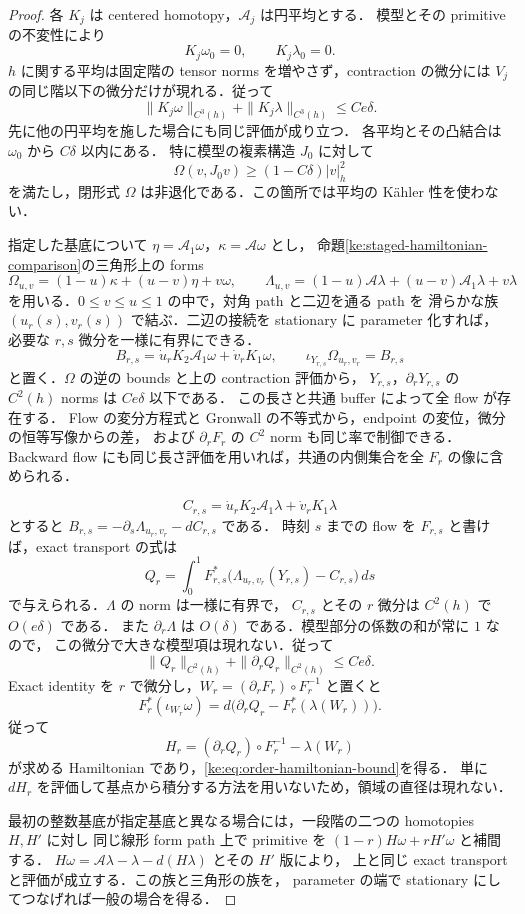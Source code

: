 \begin{proof}
各 $K_j$ は centered homotopy，$\mathcal A_j$ は円平均とする．
模型とその primitive の不変性により
\[
 K_j\omega_0=0,\qquad K_j\lambda_0=0.
\]
$h$ に関する平均は固定階の tensor norms を増やさず，contraction の微分には
$V_j$ の同じ階以下の微分だけが現れる．従って
\[
 \|K_j\omega\|_{C^3(h)}+
 \|K_j\lambda\|_{C^3(h)}\le Ce\delta.
\]
先に他の円平均を施した場合にも同じ評価が成り立つ．
各平均とその凸結合は $\omega_0$ から $C\delta$ 以内にある．
特に模型の複素構造 $J_0$ に対して
\[
 \Omega(v,J_0v)\ge(1-C\delta)|v|_h^2
\]
を満たし，閉形式 $\Omega$ は非退化である．この箇所では平均の K\"ahler 性を使わない．

指定した基底について $\eta=\mathcal A_1\omega$，$\kappa=\mathcal A\omega$ とし，
命題\ref{ke:staged-hamiltonian-comparison}の三角形上の forms
\[
 \Omega_{u,v}=(1-u)\kappa+(u-v)\eta+v\omega,\qquad
 \Lambda_{u,v}=(1-u)\mathcal A\lambda+(u-v)\mathcal A_1\lambda+v\lambda
\]
を用いる．$0\le v\le u\le1$ の中で，対角 path と二辺を通る path を
滑らかな族 $(u_r(s),v_r(s))$ で結ぶ．二辺の接続を stationary に parameter 化すれば，
必要な $r,s$ 微分を一様に有界にできる．
\[
 B_{r,s}=\dot u_r K_2\mathcal A_1\omega+\dot v_r K_1\omega,
 \qquad \iota_{Y_{r,s}}\Omega_{u_r,v_r}=B_{r,s}
\]
と置く．$\Omega$ の逆の bounds と上の contraction 評価から，
$Y_{r,s}$，$\partial_rY_{r,s}$ の $C^2(h)$ norms は $Ce\delta$ 以下である．
この長さと共通 buffer によって全 flow が存在する．
Flow の変分方程式と Gronwall の不等式から，endpoint の変位，微分の恒等写像からの差，
および $\partial_rF_r$ の $C^2$ norm も同じ率で制御できる．
Backward flow にも同じ長さ評価を用いれば，共通の内側集合を全 $F_r$ の像に含められる．

\[
 C_{r,s}=\dot u_rK_2\mathcal A_1\lambda+\dot v_rK_1\lambda
\]
とすると $B_{r,s}=-\partial_s\Lambda_{u_r,v_r}-dC_{r,s}$ である．
時刻 $s$ までの flow を $F_{r,s}$ と書けば，exact transport の式は
\[
 Q_r=\int_0^1F_{r,s}^*
       \bigl(\Lambda_{u_r,v_r}(Y_{r,s})-C_{r,s}\bigr)\,ds
\]
で与えられる．$\Lambda$ の norm は一様に有界で，
$C_{r,s}$ とその $r$ 微分は $C^2(h)$ で $O(e\delta)$ である．
また $\partial_r\Lambda$ は $O(\delta)$ である．模型部分の係数の和が常に $1$ なので，
この微分で大きな模型項は現れない．従って
\[
 \|Q_r\|_{C^2(h)}+\|\partial_rQ_r\|_{C^2(h)}\le Ce\delta.
\]
Exact identity を $r$ で微分し，$W_r=(\partial_rF_r)\circ F_r^{-1}$ と置くと
\[
 F_r^*(\iota_{W_r}\omega)
 =d\bigl(\partial_rQ_r-F_r^*(\lambda(W_r))\bigr).
\]
従って
\[
 H_r=(\partial_rQ_r)\circ F_r^{-1}-\lambda(W_r)
\]
が求める Hamiltonian であり，\eqref{ke:eq:order-hamiltonian-bound}を得る．
単に $dH_r$ を評価して基点から積分する方法を用いないため，領域の直径は現れない．

最初の整数基底が指定基底と異なる場合には，一段階の二つの homotopies $H,H'$ に対し
同じ線形 form path 上で primitive を $(1-r)H\omega+rH'\omega$ と補間する．
$H\omega=\mathcal A\lambda-\lambda-d(H\lambda)$ とその $H'$ 版により，
上と同じ exact transport と評価が成立する．この族と三角形の族を，
parameter の端で stationary にしてつなげれば一般の場合を得る．
\end{proof}

